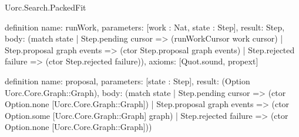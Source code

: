 \begin{lexlean}{Uorc.Search.PackedFit}
\begin{semanticmodule}
definition{
  name: runWork,
  parameters: [work : Nat, state : Step],
  result: Step,
  body: (match state
    | Step.pending cursor => (runWorkCursor work cursor)
    | Step.proposal graph events => (ctor Step.proposal graph events)
    | Step.rejected failure => (ctor Step.rejected failure)),
  axioms: [Quot.sound, propext]
}

definition{
  name: proposal,
  parameters: [state : Step],
  result: (Option Uorc.Core.Graph::Graph),
  body: (match state
    | Step.pending cursor => (ctor Option.none [Uorc.Core.Graph::Graph])
    | Step.proposal graph events => (ctor Option.some [Uorc.Core.Graph::Graph] graph)
    | Step.rejected failure => (ctor Option.none [Uorc.Core.Graph::Graph]))
}
\end{semanticmodule}
\end{lexlean}
